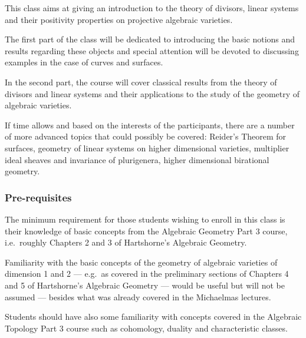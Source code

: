 \documentclass[a4paper]{article}
\begin{document}
\maketitle
{\small
\setlength{\parindent}{0em}
\setlength{\parskip}{1em}
This class aims at giving an introduction to the theory of divisors, linear systems and their positivity properties on projective algebraic varieties.

The first part of the class will be dedicated to introducing the basic notions and results regarding these objects and special attention will be devoted to discussing examples in the case of curves and surfaces.

In the second part, the course will cover classical results from the theory of divisors and linear systems and their applications to the study of the geometry of algebraic varieties.

If time allows and based on the interests of the participants, there are a number of more advanced topics that could possibly be covered: Reider's Theorem for surfaces, geometry of linear systems on higher dimensional varieties, multiplier ideal sheaves and invariance of plurigenera, higher dimensional birational geometry.

\subsubsection*{Pre-requisites}
The minimum requirement for those students wishing to enroll in this class is their knowledge of basic concepts from the Algebraic Geometry Part 3 course, i.e.\ roughly Chapters 2 and 3 of Hartshorne's Algebraic Geometry.

Familiarity with the basic concepts of the geometry of algebraic varieties of dimension 1 and 2 --- e.g.\ as covered in the preliminary sections of Chapters 4 and 5 of Hartshorne's Algebraic Geometry --- would be useful but will not be assumed --- besides what was already covered in the Michaelmas lectures.

Students should have also some familiarity with concepts covered in the Algebraic Topology Part 3 course such as cohomology, duality and characteristic classes.
}
\tableofcontents
\end{document}
